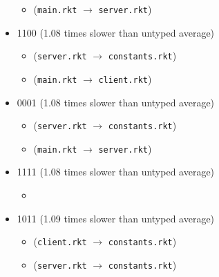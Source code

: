 \documentclass{article}
\newcommand{\mono}[1]{\texttt{#1}}
\begin{document}
\begin{itemize}
\begin{itemize}
  \item (\mono{main.rkt} $\rightarrow$ \mono{server.rkt})
  \end{itemize}
\item 1100 (1.08 times slower than untyped average)
  \begin{itemize}
  \item (\mono{server.rkt} $\rightarrow$ \mono{constants.rkt})
  \item (\mono{main.rkt} $\rightarrow$ \mono{client.rkt})
  \end{itemize}
\item 0001 (1.08 times slower than untyped average)
  \begin{itemize}
  \item (\mono{server.rkt} $\rightarrow$ \mono{constants.rkt})
  \item (\mono{main.rkt} $\rightarrow$ \mono{server.rkt})
  \end{itemize}
\item 1111 (1.08 times slower than untyped average)
  \begin{itemize}
  \item 
  \end{itemize}
\item 1011 (1.09 times slower than untyped average)
  \begin{itemize}
  \item (\mono{client.rkt} $\rightarrow$ \mono{constants.rkt})
  \item (\mono{server.rkt} $\rightarrow$ \mono{constants.rkt})
  \end{itemize}


\end{itemize}
\end{document}
